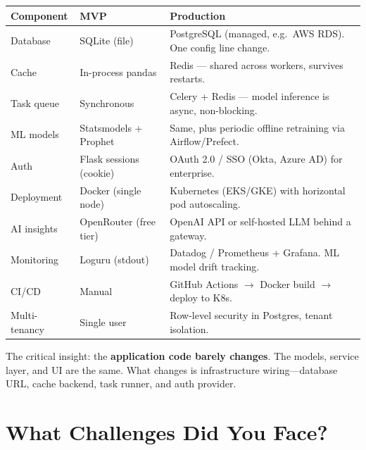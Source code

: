 \documentclass[11pt, a4paper]{article}
\begin{document}
\begin{tabularx}{\textwidth}{| l | l | X |}
    \hline
    \textbf{Component} & \textbf{MVP} & \textbf{Production} \\
    \hline\hline
    Database        & SQLite (file)           & PostgreSQL (managed, e.g.\ AWS RDS). One config line change. \\
    \hline
    Cache           & In-process pandas       & Redis --- shared across workers, survives restarts. \\
    \hline
    Task queue      & Synchronous             & Celery + Redis --- model inference is async, non-blocking. \\
    \hline
    ML models       & Statsmodels + Prophet   & Same, plus periodic offline retraining via Airflow/Prefect. \\
    \hline
    Auth            & Flask sessions (cookie) & OAuth 2.0 / SSO (Okta, Azure AD) for enterprise. \\
    \hline
    Deployment      & Docker (single node)    & Kubernetes (EKS/GKE) with horizontal pod autoscaling. \\
    \hline
    AI insights     & OpenRouter (free tier)  & OpenAI API or self-hosted LLM behind a gateway. \\
    \hline
    Monitoring      & Loguru (stdout)         & Datadog / Prometheus + Grafana. ML model drift tracking. \\
    \hline
    CI/CD           & Manual                  & GitHub Actions $\rightarrow$ Docker build $\rightarrow$ deploy to K8s. \\
    \hline
    Multi-tenancy   & Single user             & Row-level security in Postgres, tenant isolation. \\
    \hline
\end{tabularx}

The critical insight: the \textbf{application code barely changes}. The models, service layer, and UI are the same. What changes is infrastructure wiring---database URL, cache backend, task runner, and auth provider.


\section{What Challenges Did You Face?}
\end{document}
